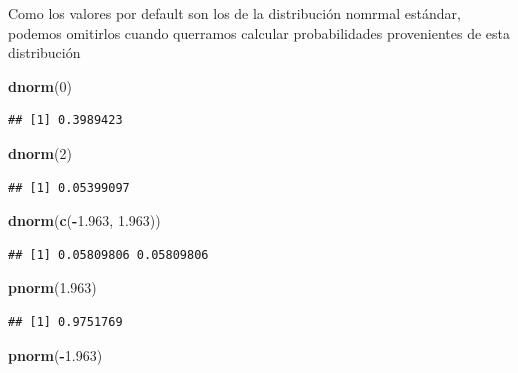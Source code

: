 \documentclass[]{article}
\newenvironment{Shaded}{\begin{snugshade}}{\end{snugshade}}
\newcommand{\DecValTok}[1]{\textcolor[rgb]{0.00,0.00,0.81}{#1}}
\newcommand{\FloatTok}[1]{\textcolor[rgb]{0.00,0.00,0.81}{#1}}
\newcommand{\KeywordTok}[1]{\textcolor[rgb]{0.13,0.29,0.53}{\textbf{#1}}}
\newcommand{\NormalTok}[1]{#1}
\newcommand{\OperatorTok}[1]{\textcolor[rgb]{0.81,0.36,0.00}{\textbf{#1}}}
\begin{document}
Como los valores por default son los de la distribución nomrmal
estándar, podemos omitirlos cuando querramos calcular probabilidades
provenientes de esta distribución

\begin{Shaded}
\begin{Highlighting}[]
\KeywordTok{dnorm}\NormalTok{(}\DecValTok{0}\NormalTok{)}
\end{Highlighting}
\end{Shaded}

\begin{verbatim}
## [1] 0.3989423
\end{verbatim}

\begin{Shaded}
\begin{Highlighting}[]
\KeywordTok{dnorm}\NormalTok{(}\DecValTok{2}\NormalTok{)}
\end{Highlighting}
\end{Shaded}

\begin{verbatim}
## [1] 0.05399097
\end{verbatim}

\begin{Shaded}
\begin{Highlighting}[]
\KeywordTok{dnorm}\NormalTok{(}\KeywordTok{c}\NormalTok{(}\OperatorTok{-}\FloatTok{1.963}\NormalTok{, }\FloatTok{1.963}\NormalTok{))}
\end{Highlighting}
\end{Shaded}

\begin{verbatim}
## [1] 0.05809806 0.05809806
\end{verbatim}

\begin{Shaded}
\begin{Highlighting}[]
\KeywordTok{pnorm}\NormalTok{(}\FloatTok{1.963}\NormalTok{)}
\end{Highlighting}
\end{Shaded}

\begin{verbatim}
## [1] 0.9751769
\end{verbatim}

\begin{Shaded}
\begin{Highlighting}[]
\KeywordTok{pnorm}\NormalTok{(}\OperatorTok{-}\FloatTok{1.963}\NormalTok{)}
\end{Highlighting}
\end{Shaded}
\end{document}
